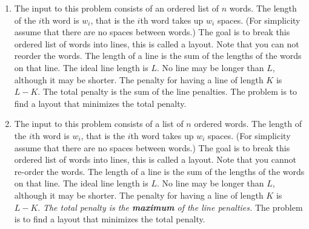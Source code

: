 \documentclass{article}
\begin{document}
    \begin{enumerate}[label=(\alph*)]
        \item The input to this problem consists of an ordered list of $n$ words. 
        The length of the $i$th word is $w_i$, that is the $i$th word takes up $w_i$ spaces. 
        (For simplicity assume that there are no spaces between words.)
        The goal is to break this ordered list of words into lines, this is called a layout. 
        Note that you can not reorder the words. 
        The length of a line is the sum of the lengths of the words on that line. 
        The ideal line length is $L$. 
        No line may be longer than $L$, although it may be shorter. 
        The penalty for having a line of length $K$ is $L − K$. 
        The total penalty is the sum of the line penalties.
        The problem is to find a layout that minimizes the total penalty.
        
        
        \item The input to this problem consists of a list of $n$ ordered words.
        The length of the $i$th word is $w_i$, that is the $i$th word takes up $w_i$ spaces.
        (For simplicity assume that there are no spaces between words.)
        The goal is to break this ordered list of words into lines, this is called a layout.
        Note that you cannot re-order the words.
        The length of a line is the sum of the lengths of the words on that line.
        The ideal line length is $L$.
        No line may be longer than $L$, although it may be shorter.
        The penalty for having a line of length $K$ is $L - K$.
        \emph{The total penalty is the \textbf{maximum} of the line penalties.}
        The problem is to find a layout that minimizes the total penalty.
        
        
    \end{enumerate}
\end{document}
